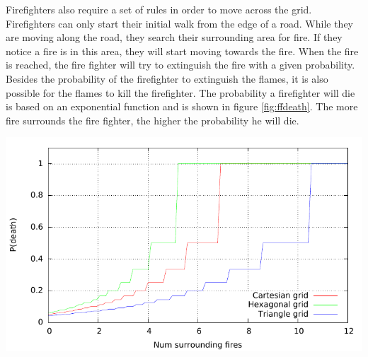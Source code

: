 \documentclass{article}
\newenvironment{Figure}
  {\par\medskip\noindent\minipage{\linewidth}}
  {\endminipage\par\medskip}
\begin{document}
\begin{multicols}{2}
Firefighters also require a set of rules in order to move across the grid. Firefighters can only start their initial walk from the edge of a road. While they are moving along the road, they search their surrounding area for fire. If they notice a fire is in this area, they will start moving towards the fire. When the fire is reached, the fire fighter will try to extinguish the fire with a given probability. Besides the probability of the firefighter to extinguish the flames, it is also possible for the flames to kill the firefighter. The probability a firefighter will die is based on an exponential function and is shown in figure \ref{fig:ffdeath}. The more fire surrounds the fire fighter, the higher the probability he will die.
\begin{Figure}
 \centering
 \includegraphics[width=1.1\textwidth]{imgs/plot/ffdeath.pdf}
\label{fig:ffdeath}
\end{Figure}


\end{multicols}
\end{document}
